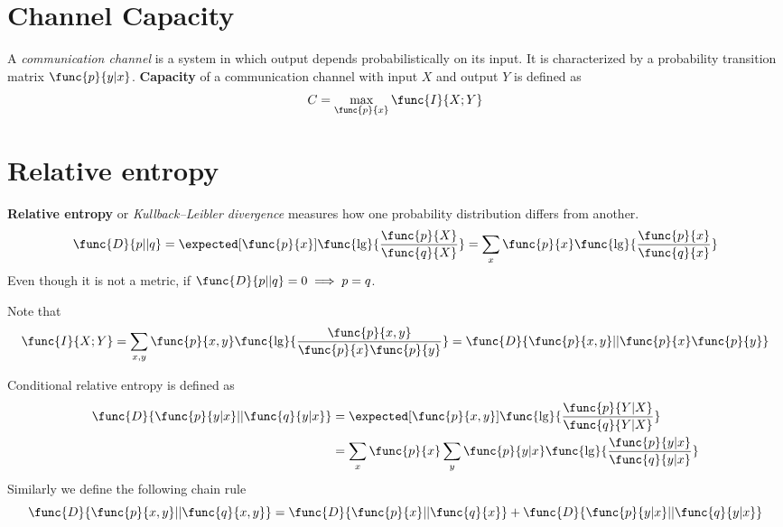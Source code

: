 \section{Channel Capacity}
A \textit{communication channel} is a system in which output depends probabilistically on its input. It is characterized by a probability transition matrix \(\func{p}{y|x}\). \textbf{Capacity} of a communication channel with input \(X\) and output \(Y\) is defined as 
\begin{equation*}
      C = \max_{\func{p}{x}} \func{I}{X;Y}
\end{equation*}

\section{Relative entropy}
\textbf{Relative entropy} or  \textit{Kullback–Leibler divergence} measures how one probability distribution differs from another. 
\begin{equation*}
      \func{D}{p || q}= \expected[\func{p}{x}]{\func{\lg}{\frac{\func{p}{X}}{\func{q}{X}}}} = \sum_{x} \func{p}{x} \func{\lg}{\frac{\func{p}{x}}{\func{q}{x}}}
\end{equation*}
Even though it is not a metric, if \(\func{D}{p || q} = 0 \implies p = q\).

Note that 
\begin{equation*}
      \func{I}{X;Y} = \sum_{x,y} \func{p}{x,y} \func{\lg}{\frac{\func{p}{x,y}}{\func{p}{x} \func{p}{y}}} = \func{D}{\func{p}{x,y} || \func{p}{x} \func{p}{y}}
\end{equation*}

Conditional relative entropy is defined as 
\begin{align*}
      \func{D}{ \func{p}{y|x} || \func{q}{y|x} } &= \expected[\func{p}{x,y}]{\func{\lg}{\frac{\func{p}{Y|X}}{\func{q}{Y|X}}}}\\
      &= \sum_{x} \func{p}{x} \sum_{y} \func{p}{y|x} \func{\lg}{\frac{\func{p}{y|x}}{\func{q}{y|x}}}
\end{align*}
Similarly we define the following chain rule 
\begin{equation*}
      \func{D}{ \func{p}{x,y} || \func{q}{x,y} } = \func{D}{ \func{p}{x} || \func{q}{x} } + \func{D}{ \func{p}{y|x} || \func{q}{y|x} }
\end{equation*}